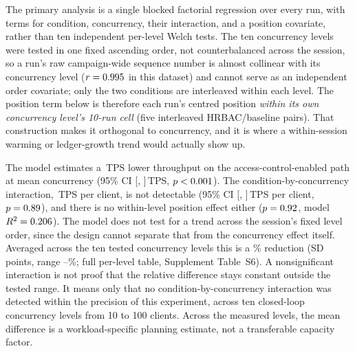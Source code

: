 \documentclass[a4paper,fleqn]{cas-sc}
\begin{document}
The primary analysis is a single blocked factorial regression over every
run, with terms for condition, concurrency, their interaction, and a
position covariate, rather than ten independent per-level Welch tests. The
ten concurrency levels were tested in one fixed ascending order, not
counterbalanced across the session, so a run's raw campaign-wide sequence
number is almost collinear with its concurrency level
($r=0.995$ in this dataset) and cannot serve as an
independent order covariate; only the two conditions are interleaved within
each level. The position term below is therefore each run's centred
position \emph{within its own concurrency level's 10-run cell} (five
interleaved HRBAC/baseline pairs). That construction makes it orthogonal to
concurrency, and it is where a within-session warming or ledger-growth
trend would actually show up.

The model estimates a \ThrCondCoef\,TPS lower throughput on the
access-control-enabled path at mean concurrency (95\% CI
[\ThrCondCoefCILow, \ThrCondCoefCIHigh]\,TPS, $p<0.001$). The
condition-by-concurrency interaction, \ThrInteractCoef\,TPS per client, is
not detectable (95\% CI [\ThrInteractCILow, \ThrInteractCIHigh]\,TPS per
client, $p=0.89$), and there is no within-level position effect
either ($p=0.92$, model $R^2=0.206$). The model does
not test for a trend across the session's fixed level order, since the
design cannot separate that from the concurrency effect itself. Averaged
across the ten tested concurrency levels this is a \OverheadMeanPct\%
reduction (SD \OverheadSDPct{} points, range
\OverheadMinPct--\OverheadMaxPct\%; full per-level table, Supplement
Table~S6). A nonsignificant interaction is not proof that the relative
difference stays constant outside the tested range. It means only that no
condition-by-concurrency interaction was detected within the precision of
this experiment, across ten closed-loop concurrency levels from 10 to 100
clients. Across the measured levels, the mean difference is a
workload-specific planning estimate, not a transferable capacity factor.
\end{document}
